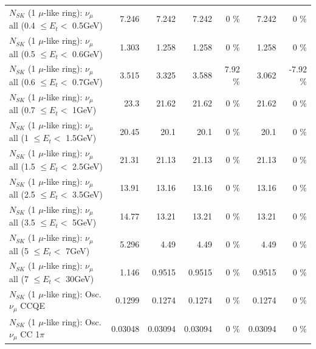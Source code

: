 \begin{table}
\begin{tabular}{| l | r | r | r  r | r  r |}
       $N_{SK}$ (1 $\mu$-like ring): $\nu_{\mu}$ all (0.4 $\leq E_{t} <$ 0.5GeV) &           7.246 &           7.242 &           7.242 &        0 \%  &           7.242 &        0 \%  \\ 
       $N_{SK}$ (1 $\mu$-like ring): $\nu_{\mu}$ all (0.5 $\leq E_{t} <$ 0.6GeV) &           1.303 &           1.258 &           1.258 &        0 \%  &           1.258 &        0 \%  \\ 
       $N_{SK}$ (1 $\mu$-like ring): $\nu_{\mu}$ all (0.6 $\leq E_{t} <$ 0.7GeV) &           3.515 &           3.325 &           3.588 &     7.92 \%  &           3.062 &    -7.92 \%  \\ 
         $N_{SK}$ (1 $\mu$-like ring): $\nu_{\mu}$ all (0.7 $\leq E_{t} <$ 1GeV) &            23.3 &           21.62 &           21.62 &        0 \%  &           21.62 &        0 \%  \\ 
         $N_{SK}$ (1 $\mu$-like ring): $\nu_{\mu}$ all (1 $\leq E_{t} <$ 1.5GeV) &           20.45 &            20.1 &            20.1 &        0 \%  &            20.1 &        0 \%  \\ 
       $N_{SK}$ (1 $\mu$-like ring): $\nu_{\mu}$ all (1.5 $\leq E_{t} <$ 2.5GeV) &           21.31 &           21.13 &           21.13 &        0 \%  &           21.13 &        0 \%  \\ 
       $N_{SK}$ (1 $\mu$-like ring): $\nu_{\mu}$ all (2.5 $\leq E_{t} <$ 3.5GeV) &           13.91 &           13.16 &           13.16 &        0 \%  &           13.16 &        0 \%  \\ 
         $N_{SK}$ (1 $\mu$-like ring): $\nu_{\mu}$ all (3.5 $\leq E_{t} <$ 5GeV) &           14.77 &           13.21 &           13.21 &        0 \%  &           13.21 &        0 \%  \\ 
           $N_{SK}$ (1 $\mu$-like ring): $\nu_{\mu}$ all (5 $\leq E_{t} <$ 7GeV) &           5.296 &            4.49 &            4.49 &        0 \%  &            4.49 &        0 \%  \\ 
          $N_{SK}$ (1 $\mu$-like ring): $\nu_{\mu}$ all (7 $\leq E_{t} <$ 30GeV) &           1.146 &          0.9515 &          0.9515 &        0 \%  &          0.9515 &        0 \%  \\ 
\hline
\hline
                               $N_{SK}$ (1 $\mu$-like ring): Osc. $\nu_\mu$ CCQE &          0.1299 &          0.1274 &          0.1274 &        0 \%  &          0.1274 &        0 \%  \\ 
                          $N_{SK}$ (1 $\mu$-like ring): Osc. $\nu_\mu$ CC 1$\pi$ &         0.03048 &         0.03094 &         0.03094 &        0 \%  &         0.03094 &        0 \%  \\ 

\end{tabular}
\end{table}
